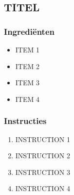 \subsection{TITEL}
\subsubsection*{Ingrediënten}
\begin{multicols}{2}
    \begin{itemize}
        \item ITEM 1
        \item ITEM 2
        \item ITEM 3
        \item ITEM 4
    \end{itemize}
\end{multicols}

\subsubsection*{Instructies}
\begin{multicols}{2}
    \begin{enumerate}
        \item INSTRUCTION 1
        \item INSTRUCTION 2
        \item INSTRUCTION 3
        \item INSTRUCTION 4
    \end{enumerate}
\end{multicols}